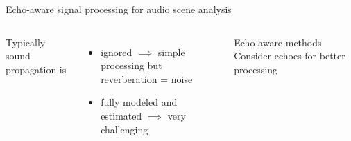 \begin{frame}[t]{\alert{Echo-aware signal processing for audio scene analysis}}
    \begin{columns}
        Typically sound propagation is
        \begin{itemize}
            \item ignored $\implies$ simple processing but reverberation = noise
            \item fully modeled and estimated $\implies$ very challenging
        \end{itemize}

        \begin{mydefblock}{Echo-aware methods}
            Consider echoes for better processing
        \end{mydefblock}
    \end{columns}




\end{frame}
